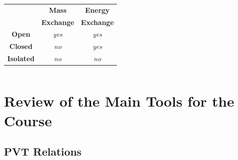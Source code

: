 \documentclass[10pt,compress]{beamer}
\begin{document}
\begin{frame}
\begin{columns}
\begin{column}[l]{0.4\linewidth}
\begin{figure}
\begin{center}
        \end{center}
      \end{figure}
      \begin{tabular}{|c|c|c|}
         \hline
                      & {\bf Mass} & {\bf Energy} \\
                      & {\bf Exchange} & {\bf Exchange} \\
         \hline
         {\bf Open}   & {\it yes}  & {\it yes}    \\
         {\bf Closed} & {\it no}   & {\it yes}    \\
         {\bf Isolated}&{\it no}   & {\it no}     \\
         \hline 
      \end{tabular}    
    \end{column}
  \end{columns}
\end{frame}




\section{Review of the Main Tools for the Course}


\subsection{PVT Relations}
\end{document}
